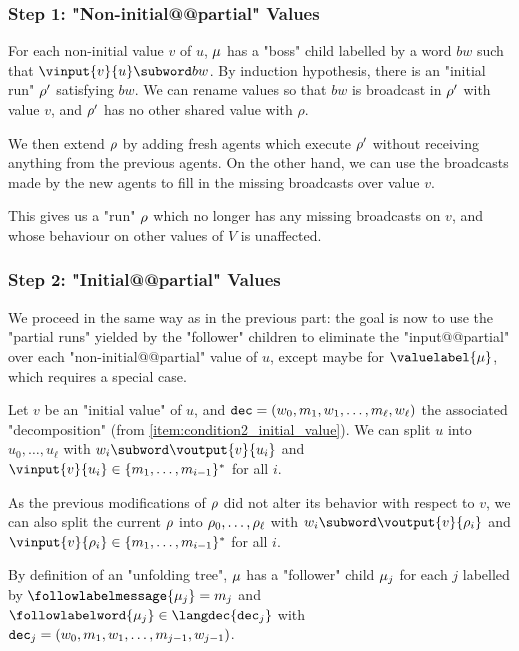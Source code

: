 \subsubsection{Step 1: "Non-initial@@partial" Values}
\label{sec:tree-to-run-step-one}

For each non-initial value $v$ of $u$, $\mu$ has a "boss" child labelled by a word $bw$ such that $\vinput{v}{u} \subword bw$.
By induction hypothesis, there is an "initial run" $\rho'$ satisfying $bw$.
We can rename values so that $bw$ is broadcast in $\rho'$ with value $v$, and $\rho'$ has no other shared value with $\rho$.

We then extend $\rho$ by adding fresh agents which execute $\rho'$ without receiving anything from the previous agents. On the other hand, we can use the broadcasts made by the new agents to fill in the missing broadcasts over value $v$.

This gives us a "run" $\rho$ which no longer has any missing broadcasts on $v$, and whose behaviour on other values of $V$ is unaffected.

\subsubsection{Step 2: "Initial@@partial" Values}
\label{sec:tree-to-run-step-two}

We proceed in the same way as in the previous part: the goal is now to use the "partial runs" yielded by the "follower" children to eliminate the "input@@partial" over each "non-initial@@partial" value of $u$, except maybe for $\valuelabel{\node}$, which requires a special case.

Let $v$ be an "initial value" of $u$, and $\mathtt{dec} = (w_0, m_1, w_1, \ldots, m_\ell, w_\ell)$ the associated "decomposition" (from \ref{item:condition2_initial_value}). We can split $u$ into $u_0, \ldots, u_\ell$ with $w_i \subword \voutput{\aval}{\localrun_i}$ and $\vinput{\aval}{\localrun_i} \in \set{m_1, \dots, m_{i-1}}^*$ for all $i$. 

As the previous modifications of $\rho$ did not alter its behavior with respect to $v$, we can also split the current $\rho$ into $\rho_0, \ldots, \rho_\ell$ with $w_i \subword \voutput{\aval}{\run_i}$ and $\vinput{\aval}{\run_i} \in \set{m_1, \dots, m_{i-1}}^*$ for all $i$. 

By definition of an "unfolding tree", $\mu$ has a "follower" child $\mu_j$ for each $j$ labelled by $\followlabelmessage{\node_j} = m_j$ and $\followlabelword{\node_j} \in \langdec{\decsymb_j}$ with $\mathtt{dec}_j = (w_0, m_1, w_1, \ldots, m_{j-1}, w_{j-1})$. 

